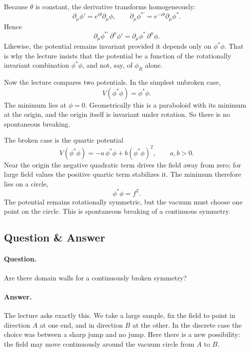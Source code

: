 Because \(\theta\) is constant, the derivative transforms homogeneously:
\begin{equation}
\partial_\mu\phi' = e^{i\theta}\partial_\mu\phi,
\qquad
\partial_\mu\phi^{*\prime}=e^{-i\theta}\partial_\mu\phi^*.
\label{eq:global-derivative-transform}
\end{equation}
Hence
\[
\partial_\mu\phi^{*\prime}\,\partial^\mu\phi'
=
\partial_\mu\phi^*\,\partial^\mu\phi.
\]
Likewise, the potential remains invariant provided it depends only on \(\phi^*\phi\). That is why the lecture insists that the potential be a function of the rotationally invariant combination \(\phi^*\phi\), and not, say, of \(\phi_R\) alone.

Now the lecture compares two potentials. In the simplest unbroken case,
\begin{equation}
V(\phi^*\phi)=\phi^*\phi.
\label{eq:symmetric-paraboloid}
\end{equation}
The minimum lies at \(\phi=0\). Geometrically this is a paraboloid with its minimum at the origin, and the origin itself is invariant under rotation. So there is no spontaneous breaking.

The broken case is the quartic potential
\begin{equation}
V(\phi^*\phi)=-a\,\phi^*\phi+b(\phi^*\phi)^2,
\qquad a,b>0.
\label{eq:mexican-hat-refined}
\end{equation}
Near the origin the negative quadratic term drives the field away from zero; for large field values the positive quartic term stabilizes it. The minimum therefore lies on a circle,
\begin{equation}
\phi^*\phi=f^2.
\label{eq:vacuum-circle-refined}
\end{equation}
The potential remains rotationally symmetric, but the vacuum must choose one point on the circle. This is spontaneous breaking of a continuous symmetry.

\subsection{Question \& Answer}

\paragraph{Question.} Are there domain walls for a continuously broken symmetry?

\paragraph{Answer.} The lecture asks exactly this. We take a large sample, fix the field to point in direction \(A\) at one end, and in direction \(B\) at the other. In the discrete case the choice was between a sharp jump and no jump. Here there is a new possibility: the field may move continuously around the vacuum circle from \(A\) to \(B\).

